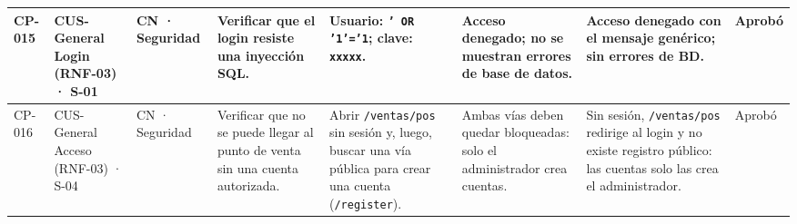 \begin{landscape}
\begin{xltabular}{\linewidth}{|C{1.15cm}|L{2.35cm}|C{1.65cm}|L{3.55cm}|L{3.0cm}|Y|Y|C{1.3cm}|}
  CP-015 & CUS-General Login (RNF-03) · S-01 & CN · Seguridad & Verificar que el login resiste una inyección SQL. & Usuario: \newline \texttt{' OR '1'='1}; \newline clave: \texttt{xxxxx}. & Acceso denegado; no se muestran errores de base de datos. & Acceso denegado con el mensaje genérico; sin errores de BD. & Aprobó \\ \hline

  CP-016 & CUS-General Acceso (RNF-03) · S-04 & CN · Seguridad & Verificar que no se puede llegar al punto de venta sin una cuenta autorizada. & Abrir \texttt{/ventas/pos} sin sesión y, luego, buscar una vía pública para crear una cuenta (\texttt{/register}). & Ambas vías deben quedar bloqueadas: solo el administrador crea cuentas. & Sin sesión, \texttt{/ventas/pos} redirige al login y no existe registro público: las cuentas solo las crea el administrador. & Aprobó \\
\end{xltabular}
\endgroup
\end{landscape}

